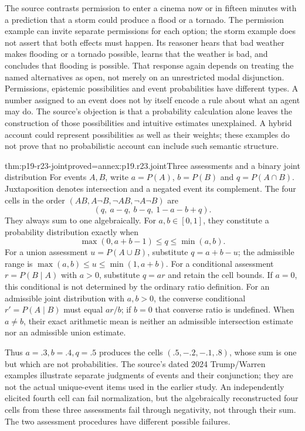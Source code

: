 The source contrasts permission to enter a cinema now or in fifteen
minutes with a prediction that a storm could produce a flood or a tornado.
The permission example can invite separate permissions for each option;
the storm example does not assert that both effects must happen. Its
reasoner hears that bad weather makes flooding or a tornado possible,
learns that the weather is bad, and concludes that flooding is possible.
That response again depends on treating the named alternatives as open,
not merely on an unrestricted modal disjunction.
Permissions, epistemic possibilities and event probabilities have different
types. A number assigned to an event does not by itself encode a rule
about what an agent may do. The source's objection is that a probability
calculation alone leaves the construction of those possibilities and
intuitive estimates unexplained. A hybrid account could represent
possibilities as well as their weights; these examples do not prove
that no probabilistic account can include such semantic structure.

\begin{hbtheorem}{thm:p19-r23-joint}{proved=annex:p19.r23.joint}{Three assessments and a binary joint distribution}
For events \(A,B\), write \(a=P(A)\), \(b=P(B)\) and
\(q=P(A\cap B)\). Juxtaposition denotes intersection and a negated
event its complement. The four cells in the order
\((A B,A\neg B,\neg A B,\neg A\neg B)\) are
\[
 (q,\ a-q,\ b-q,\ 1-a-b+q).
\]
They always sum to one algebraically. For \(a,b\in[0,1]\), they
constitute a probability distribution exactly when
\[
 \max(0,a+b-1)\leq q\leq\min(a,b).
\]
For a union assessment \(u=P(A\cup B)\), substitute \(q=a+b-u\);
the admissible range is \(\max(a,b)\leq u\leq\min(1,a+b)\).
For a conditional assessment \(r=P(B\mid A)\) with \(a>0\),
substitute \(q=ar\) and retain the cell bounds. If \(a=0\), this
conditional is not determined by the ordinary ratio definition.
For an admissible joint distribution with \(a,b>0\), the converse
conditional \(r'=P(A\mid B)\) must equal \(ar/b\); if \(b=0\)
that converse ratio is undefined. When \(a\ne b\), their exact
arithmetic mean is neither an admissible intersection estimate nor
an admissible union estimate.
\end{hbtheorem}

Thus \(a=.3,b=.4,q=.5\) produces the cells
\((.5,-.2,-.1,.8)\), whose sum is one but which are not probabilities.
The source's dated 2024 Trump/Warren examples illustrate separate judgments
of events and their conjunction; they are not the actual unique-event
items used in the earlier study. An independently elicited fourth cell
can fail normalization, but the algebraically reconstructed four cells
from these three assessments fail through negativity, not through their
sum. The two assessment procedures have different possible failures.

